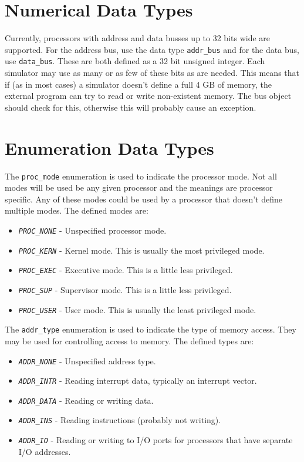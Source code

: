 \documentclass[10pt, openany]{book}
\newcommand{\constant}[1]{\emph{\texttt{#1}}}
\newcommand{\datatype}[1]{\texttt{#1}}
\begin{document}
\section{Numerical Data Types}
Currently, processors with address and data busses up to 32 bits wide are supported.
For the address bus, use the data type \datatype{addr\_bus}  and for the data bus, use \datatype{data\_bus}.
These are both defined as a 32 bit unsigned integer.
Each simulator may use as many or as few of these bits as are needed.
This means that if (as in most cases) a simulator doesn't define a full 4 GB of memory, the external program can try to read or write non-existent memory.
The bus object should check for this, otherwise this will probably cause an exception.

\section{Enumeration Data Types}
The \datatype{proc\_mode} enumeration is used to indicate the processor mode.
Not all modes will be used be any given processor and the meanings are processor specific.
Any of these modes could be used by a processor that doesn't define multiple modes.
The defined modes are:
\begin{itemize}
  \item \constant{PROC\_NONE} - Unspecified processor mode.
  \item \constant{PROC\_KERN} - Kernel mode.  This is usually the most privileged mode.
  \item \constant{PROC\_EXEC} - Executive mode.  This is a little less privileged.
  \item \constant{PROC\_SUP} - Supervisor mode.  This is a little less privileged.
  \item \constant{PROC\_USER} - User mode.  This is usually the least privileged mode.
\end{itemize}

The \datatype{addr\_type} enumeration is used to indicate the type of memory access.
They may be used for controlling access to memory.
The defined types are:
\begin{itemize}
  \item \constant{ADDR\_NONE} - Unspecified address type.
  \item \constant{ADDR\_INTR} - Reading interrupt data, typically an interrupt vector.
  \item \constant{ADDR\_DATA} - Reading or writing data.
  \item \constant{ADDR\_INS} - Reading instructions (probably not writing).
  \item \constant{ADDR\_IO} - Reading or writing to I/O ports for processors that have separate I/O addresses.
\end{itemize}
\end{document}
